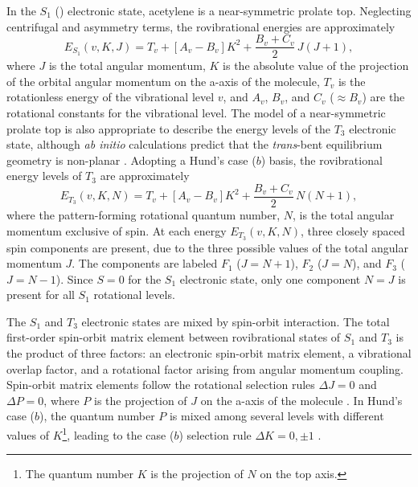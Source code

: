 In the $S_1$ (\astate) electronic state, acetylene is a near-symmetric
prolate top.  Neglecting centrifugal and asymmetry terms, the
rovibrational energies are approximately \cite{watson82}
\begin{equation}
  \label{eq:s1-energy-levels}
  E_{S_1}(v,K,J) = T_v + [A_v - B_v] K^2 + \frac{B_v+C_v}{2} \, J(J+1),
\end{equation}
where $J$ is the total angular momentum, $K$ is the absolute value of
the projection of the orbital angular momentum on the a-axis of the
molecule, $T_v$ is the rotationless energy of the vibrational level
$v$, and $A_v$, $B_v$, and $C_v$ ($\approx B_v$) are the rotational
constants for the vibrational level.  The model of a near-symmetric
prolate top is also appropriate to describe the energy levels of the
$T_3$ electronic state, although \emph{ab initio} calculations predict
that the \emph{trans}-bent equilibrium geometry is non-planar
\cite{ventura03, thom07}.  Adopting a Hund's case ($b$) basis, the
rovibrational energy levels of $T_3$ are approximately
\begin{equation}
  \label{eq:t3-energy-levels}
  E_{T_3}(v,K,N) = T_v + [A_v - B_v] K^2 + \frac{B_v+C_v}{2} \, N(N+1),
\end{equation}
where the pattern-forming rotational quantum number, $N$, is the total
angular momentum exclusive of spin.  At each energy $E_{T_3}(v,K,N)$,
three closely spaced spin components are present, due to the three
possible values of the total angular momentum $J$.  The components are
labeled $F_1$ ($J=N+1$), $F_2$ ($J=N$), and $F_3$ ($J=N-1$).  
Since $S=0$ for the $S_1$ electronic state,
only one component $N=J$ is present for all $S_1$ rotational levels.



The $S_1$ and $T_3$ electronic states are mixed by spin-orbit
interaction.  The total first-order spin-orbit matrix element between
rovibrational states of $S_1$ and $T_3$ is the product of three
factors: an electronic spin-orbit matrix element, a vibrational
overlap factor, and a rotational factor arising from angular momentum
coupling.  Spin-orbit matrix elements follow the rotational selection
rules $\Delta J = 0$ and $\Delta P = 0$, where $P$ is the projection
of $J$ on the a-axis of the molecule \cite{hougen64}.  In Hund's case
($b$), the quantum number $P$ is mixed among several levels with
different values of $K$\footnote{The quantum number $K$ is the
  projection of $N$ on the top axis.}, leading to the case ($b$)
selection rule $\Delta K = 0, \pm 1$ \cite{hougen64, stevens73}.


